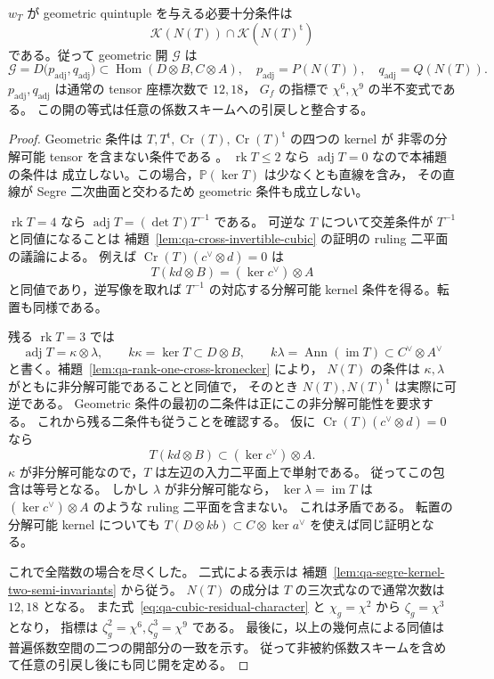 \begin{lemma}[Geometric条件の二半不変式による判定]
\label{lem:qa-cubic-adjugate-two-invariants}
$w_T$ が geometric quintuple を与える必要十分条件は
\[
 \mathcal K(N(T))\cap\mathcal K(N(T)^{\mathrm t})
\]
である。従って geometric 開 $\mathscr G$ は
\[
 \mathscr G
   =D\bigl(p_{\mathrm{adj}},q_{\mathrm{adj}}\bigr)
       \subset\operatorname{Hom}(D\otimes B,C\otimes A),
 \quad
 p_{\mathrm{adj}}=P(N(T)),\quad q_{\mathrm{adj}}=Q(N(T)).
 \tag{CA}\label{eq:qa-cubic-adjugate-open}
\]
$p_{\mathrm{adj}},q_{\mathrm{adj}}$ は通常の tensor 座標次数で $12,18$，
$G_f$ の指標で $\chi^6,\chi^9$ の半不変式である。
この開の等式は任意の係数スキームへの引戻しと整合する。
\end{lemma}
\begin{proof}
Geometric 条件は $T,T^{\mathrm t},
\operatorname{Cr}(T),\operatorname{Cr}(T)^{\mathrm t}$ の四つの kernel が
非零の分解可能 tensor を含まない条件である
\cite[Definition 5.3.1]{VdB2011}。
$\operatorname{rk}T\le2$ なら $\operatorname{adj}T=0$ なので本補題の条件は
成立しない。この場合，$\mathbb P(\ker T)$ は少なくとも直線を含み，
その直線が Segre 二次曲面と交わるため geometric 条件も成立しない。

$\operatorname{rk}T=4$ なら
$\operatorname{adj}T=(\det T)T^{-1}$ である。
可逆な $T$ について交差条件が $T^{-1}$ と同値になることは
補題~\ref{lem:qa-cross-invertible-cubic} の証明の ruling 二平面の議論による。
例えば $\operatorname{Cr}(T)(c^\vee\otimes d)=0$ は
\[
 T(kd\otimes B)=(\ker c^\vee)\otimes A
\]
と同値であり，逆写像を取れば $T^{-1}$ の対応する分解可能 kernel
条件を得る。転置も同様である。

残る $\operatorname{rk}T=3$ では
\[
 \operatorname{adj}T=\kappa\otimes\lambda,\qquad
 k\kappa=\ker T\subset D\otimes B,\qquad
 k\lambda=\operatorname{Ann}(\operatorname{im}T)
                    \subset C^\vee\otimes A^\vee
\]
と書く。補題~\ref{lem:qa-rank-one-cross-kronecker} により，
$N(T)$ の条件は $\kappa,\lambda$ がともに非分解可能であることと同値で，
そのとき $N(T),N(T)^{\mathrm t}$ は実際に可逆である。
Geometric 条件の最初の二条件は正にこの非分解可能性を要求する。
これから残る二条件も従うことを確認する。
仮に $\operatorname{Cr}(T)(c^\vee\otimes d)=0$ なら
\[
 T(kd\otimes B)\subset(\ker c^\vee)\otimes A .
\]
$\kappa$ が非分解可能なので，$T$ は左辺の入力二平面上で単射である。
従ってこの包含は等号となる。
しかし $\lambda$ が非分解可能なら，
$\ker\lambda=\operatorname{im}T$ は
$(\ker c^\vee)\otimes A$ のような ruling 二平面を含まない。
これは矛盾である。
転置の分解可能 kernel についても
$T(D\otimes kb)\subset C\otimes\ker a^\vee$ を使えば同じ証明となる。

これで全階数の場合を尽くした。
二式による表示は
補題~\ref{lem:qa-segre-kernel-two-semi-invariants} から従う。
$N(T)$ の成分は $T$ の三次式なので通常次数は $12,18$ となる。
また式~\eqref{eq:qa-cubic-residual-character} と
$\chi_g=\chi^2$ から $\zeta_g=\chi^3$ となり，
指標は $\zeta_g^2=\chi^6,\zeta_g^3=\chi^9$ である。
最後に，以上の幾何点による同値は普遍係数空間の二つの開部分の一致を示す。
従って非被約係数スキームを含めて任意の引戻し後にも同じ開を定める。
\end{proof}

